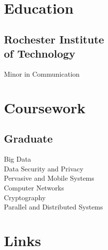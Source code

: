 \documentclass[letterpaper]{fowles-resume} %
\begin{document}
\begin{minipage}[t]{0.33\textwidth} %


\section{Education} 

\subsection[School]{Rochester Institute \\ of Technology}


\sectionspace %

\sectionspace %
Minor in Communication \\

\sectionspace %

\section{Coursework}

\subsection{Graduate}
Big Data\\
Data Security and Privacy \\
Pervasive and Mobile Systems\\
Computer Networks\\
Cryptography\\
Parallel and Distributed Systems


\section{Links} 


\end{minipage}
\end{document}
